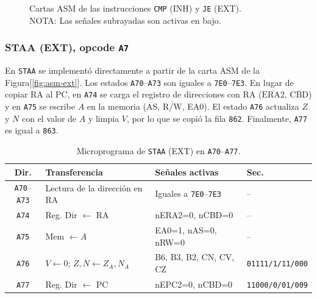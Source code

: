 \documentclass[letterpaper,12pt]{article}
\newcommand{\hx}[1]{\texttt{#1}}
\begin{document}
\begin{figure}[H]
\caption{Cartas ASM de las instrucciones \texttt{CMP} (INH) y \texttt{JE} (EXT).  \\ NOTA: Las señales subrayadas son activas en bajo.}
\label{fig:asm-nuevas}
\end{figure}

\subsubsection{STAA (EXT), opcode \texttt{A7}}

En \texttt{STAA} se implementó directamente a partir de la carta ASM de la Figura[\ref{fig:asm-ext}]. Los estados \hx{A70}--\hx{A73} son iguales a \hx{7E0}--\hx{7E3}. En lugar de copiar RA al PC, en \hx{A74} se carga el registro de direcciones con RA ($\overline{\text{ERA2}}$, $\overline{\text{CBD}}$) y en \hx{A75} se escribe $A$ en la memoria ($\overline{\text{AS}}$, $\overline{\text{R/W}}$, EA0). El estado \hx{A76} actualiza $Z$ y $N$ con el valor de $A$ y limpia $V$, por lo que se copió la fila \hx{862}. Finalmente, \hx{A77} es igual a \hx{863}.

\begin{table}[H]
\centering
\scriptsize
\caption{Microprograma de \texttt{STAA} (EXT) en \hx{A70}--\hx{A77}.}
\label{tab:staa}
\begin{tabularx}{\linewidth}{c l Y l}
\toprule
Dir. & Transferencia & Señales activas & Sec. \\
\midrule
\hx{A70}--\hx{A73} & Lectura de la dirección en RA & Iguales a \hx{7E0}--\hx{7E3} & -- \\
\hx{A74} & Reg. Dir $\leftarrow$ RA & nERA2=0, nCBD=0 & -- \\
\hx{A75} & Mem $\leftarrow A$ & EA0=1, nAS=0, nRW=0 & -- \\
\hx{A76} & $V\leftarrow 0$; $Z,N\leftarrow Z_A,N_A$ & B6, B3, B2, CN, CV, CZ & \texttt{01111/1/11/000} \\
\hx{A77} & Reg. Dir $\leftarrow$ PC & nEPC2=0, nCBD=0 & \texttt{11000/0/01/009} \\
\bottomrule
\end{tabularx}
\end{table}
\end{document}
